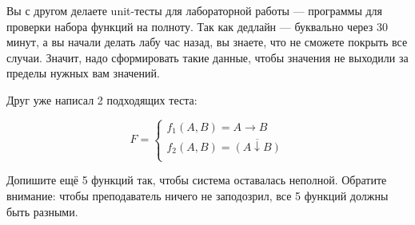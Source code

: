 \question
Вы с другом делаете unit-тесты для лабораторной работы — программы для проверки набора функций на полноту. Так как дедлайн — буквально через 30 минут, а вы начали делать лабу час назад, вы знаете, что не сможете покрыть все случаи. Значит, надо сформировать такие данные, чтобы значения не выходили за пределы нужных вам значений.

Друг уже написал 2 подходящих теста:

\begin{equation*}
    F=
    \begin{cases}
        f_1(A,B)=A \rightarrow B\\
        f_2(A,B)=\overline{(A \downarrow B)}\\
    \end{cases}
\end{equation*}
    
Допишите ещё 5 функций так, чтобы система оставалась неполной. Обратите внимание: чтобы преподаватель ничего не заподозрил, все 5 функций должны быть разными.